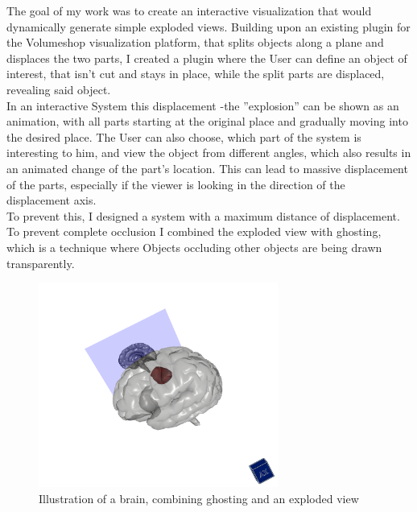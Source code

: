 The goal of my work was to create an interactive visualization that would dynamically generate simple exploded views. Building upon an existing plugin for the Volumeshop visualization platform, that splits objects along a plane and displaces the two parts,  I created a plugin where the User can define an object of interest, that isn't cut and stays in place, while the split parts are displaced, revealing said object.\\
In an interactive System this displacement -the ''explosion'' can be shown as an animation, with all parts starting at the original place and gradually moving into the desired place. The User can also choose, which part of the system is interesting to him, and view the object from different angles, which also results in an animated change of the part's location. This can lead to massive displacement of the parts, especially if the viewer is looking in the direction of the displacement axis.\\
To prevent this,  I designed a system with a maximum distance of displacement. To prevent complete  occlusion I combined the exploded view with ghosting, which is a technique where Objects occluding other objects are being drawn transparently. \\
\begin{figure}[tb]
	\centering
	\includegraphics[width=0.7\textwidth]{chapters/figures/demo}
	\caption{Illustration of a brain, combining ghosting and an exploded view}
	\label{fig:demo}
\end{figure}